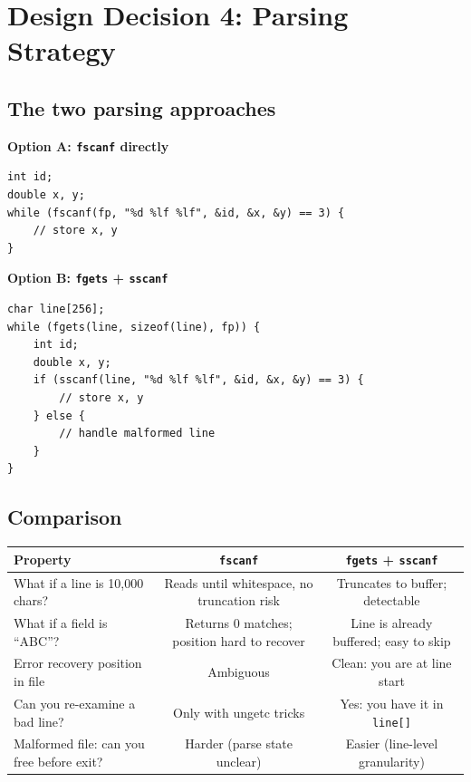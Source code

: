 \newpage

\section{Design Decision 4: Parsing Strategy}

\subsection{The two parsing approaches}

\textbf{Option A: \texttt{fscanf} directly}
\begin{lstlisting}[style=cstyle]
int id;
double x, y;
while (fscanf(fp, "%d %lf %lf", &id, &x, &y) == 3) {
    // store x, y
}
\end{lstlisting}

\textbf{Option B: \texttt{fgets} + \texttt{sscanf}}
\begin{lstlisting}[style=cstyle]
char line[256];
while (fgets(line, sizeof(line), fp)) {
    int id;
    double x, y;
    if (sscanf(line, "%d %lf %lf", &id, &x, &y) == 3) {
        // store x, y
    } else {
        // handle malformed line
    }
}
\end{lstlisting}

\subsection{Comparison}

\begin{center}
\renewcommand{\arraystretch}{1.5}
\begin{tabular}{lcc}
\toprule
Property & \texttt{fscanf} & \texttt{fgets} + \texttt{sscanf} \\
\midrule
What if a line is 10,000 chars? & Reads until whitespace, no truncation risk & Truncates to buffer; detectable \\
What if a field is ``ABC''? & Returns 0 matches; position hard to recover & Line is already buffered; easy to skip \\
Error recovery position in file & Ambiguous & Clean: you are at line start \\
Can you re-examine a bad line? & Only with ungetc tricks & Yes: you have it in \texttt{line[]} \\
Malformed file: can you free before exit? & Harder (parse state unclear) & Easier (line-level granularity) \\
\bottomrule
\end{tabular}
\end{center}

